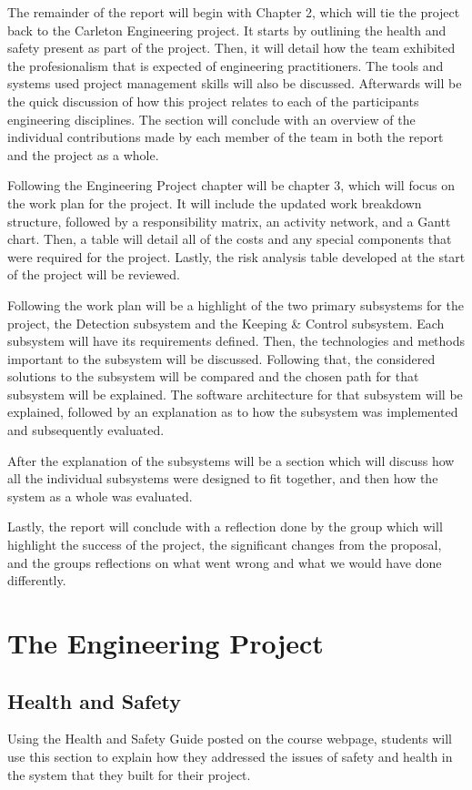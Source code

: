 \documentclass[titlepage,draft]{article}
\begin{document}
The remainder of the report will begin with Chapter 2, which will tie the project back to the Carleton Engineering project. It starts by outlining the health and safety present as part of the project.  Then, it will detail how the team exhibited the profesionalism that is expected of engineering practitioners. The tools and systems used project management skills will also be discussed. Afterwards will be the quick discussion of how this project relates to each of the participants engineering disciplines. The section will conclude with an overview of the individual contributions made by each member of the team in both the report and the project as a whole.

Following the Engineering Project chapter will be chapter 3, which will focus on the work plan for the project. It will include the updated work breakdown structure, followed by a responsibility matrix, an activity network, and a Gantt chart. Then, a table will detail all of the costs and any special components that were required for the project. Lastly, the risk analysis table developed at the start of the project will be reviewed.

Following the work plan will be a highlight of the two primary subsystems for the project, the Detection subsystem and the Keeping \& Control subsystem. Each subsystem will have its requirements defined. Then, the technologies and methods important to the subsystem will be discussed. Following that, the considered solutions to the subsystem will be compared and the chosen path for that subsystem will be explained. The software architecture for that subsystem will be explained, followed by an explanation as to how the subsystem was implemented and subsequently evaluated.

After the explanation of the subsystems will be a section which will discuss how all the individual subsystems were designed to fit together, and then how the system as a whole was evaluated.

Lastly, the report will conclude with a reflection done by the group which will highlight the success of the project, the significant changes from the proposal, and the groups reflections on what went wrong and what we would have done differently.

\section{The Engineering Project}

\subsection{Health and Safety}
Using the Health and Safety Guide posted on the course webpage, students will use this section to explain how they addressed the issues of safety and health in the system that they built for their project.
\end{document}
